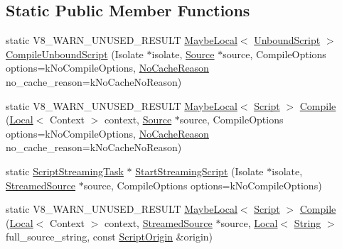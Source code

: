 \subsection*{Static Public Member Functions}
\begin{DoxyCompactItemize}
\item 
static V8\+\_\+\+W\+A\+R\+N\+\_\+\+U\+N\+U\+S\+E\+D\+\_\+\+R\+E\+S\+U\+LT \mbox{\hyperlink{classv8_1_1MaybeLocal}{Maybe\+Local}}$<$ \mbox{\hyperlink{classv8_1_1UnboundScript}{Unbound\+Script}} $>$ \mbox{\hyperlink{classv8_1_1ScriptCompiler_a65f85be54b26efb1f47543c5895f7008}{Compile\+Unbound\+Script}} (Isolate $\ast$isolate, \mbox{\hyperlink{classv8_1_1ScriptCompiler_1_1Source}{Source}} $\ast$source, Compile\+Options options=k\+No\+Compile\+Options, \mbox{\hyperlink{classv8_1_1ScriptCompiler_a7f13fa15484cfc500ae51927756e0d60}{No\+Cache\+Reason}} no\+\_\+cache\+\_\+reason=k\+No\+Cache\+No\+Reason)
\item 
static V8\+\_\+\+W\+A\+R\+N\+\_\+\+U\+N\+U\+S\+E\+D\+\_\+\+R\+E\+S\+U\+LT \mbox{\hyperlink{classv8_1_1MaybeLocal}{Maybe\+Local}}$<$ \mbox{\hyperlink{classv8_1_1Script}{Script}} $>$ \mbox{\hyperlink{classv8_1_1ScriptCompiler_a3df9c0af702e46303ded03e84fc5e519}{Compile}} (\mbox{\hyperlink{classv8_1_1Local}{Local}}$<$ Context $>$ context, \mbox{\hyperlink{classv8_1_1ScriptCompiler_1_1Source}{Source}} $\ast$source, Compile\+Options options=k\+No\+Compile\+Options, \mbox{\hyperlink{classv8_1_1ScriptCompiler_a7f13fa15484cfc500ae51927756e0d60}{No\+Cache\+Reason}} no\+\_\+cache\+\_\+reason=k\+No\+Cache\+No\+Reason)
\item 
static \mbox{\hyperlink{classv8_1_1ScriptCompiler_1_1ScriptStreamingTask}{Script\+Streaming\+Task}} $\ast$ \mbox{\hyperlink{classv8_1_1ScriptCompiler_a556e64fe39f5bcafd9f4c04957776f60}{Start\+Streaming\+Script}} (Isolate $\ast$isolate, \mbox{\hyperlink{classv8_1_1ScriptCompiler_1_1StreamedSource}{Streamed\+Source}} $\ast$source, Compile\+Options options=k\+No\+Compile\+Options)
\item 
static V8\+\_\+\+W\+A\+R\+N\+\_\+\+U\+N\+U\+S\+E\+D\+\_\+\+R\+E\+S\+U\+LT \mbox{\hyperlink{classv8_1_1MaybeLocal}{Maybe\+Local}}$<$ \mbox{\hyperlink{classv8_1_1Script}{Script}} $>$ \mbox{\hyperlink{classv8_1_1ScriptCompiler_a47429c4fb199c3bc55cb5fd7f8423d8e}{Compile}} (\mbox{\hyperlink{classv8_1_1Local}{Local}}$<$ Context $>$ context, \mbox{\hyperlink{classv8_1_1ScriptCompiler_1_1StreamedSource}{Streamed\+Source}} $\ast$source, \mbox{\hyperlink{classv8_1_1Local}{Local}}$<$ \mbox{\hyperlink{classv8_1_1String}{String}} $>$ full\+\_\+source\+\_\+string, const \mbox{\hyperlink{classv8_1_1ScriptOrigin}{Script\+Origin}} \&origin)

\end{DoxyCompactItemize}
